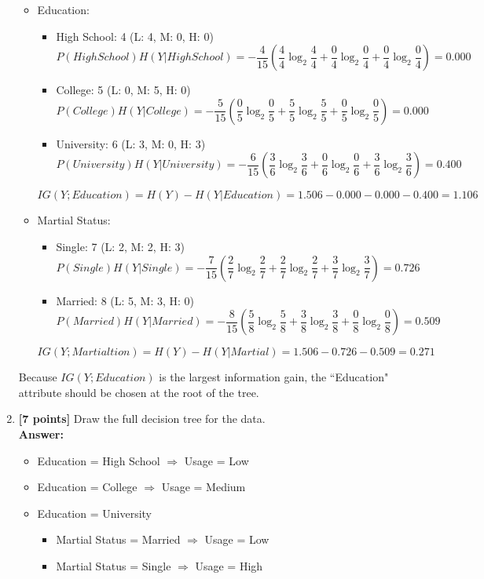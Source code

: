 \begin{enumerate}
\begin{itemize}
	\item Education:
	\begin{itemize}
		\item High School: 4 (L: 4, M: 0, H: 0)
		$$P(High School)H(Y|High School)=-\frac{4}{15}(\frac{4}{4}\log_2\frac{4}{4}+\frac{0}{4}\log_2\frac{0}{4}+\frac{0}{4}\log_2\frac{0}{4})=0.000$$
		\item College: 5 (L: 0, M: 5, H: 0)
		$$P(College)H(Y|College)=-\frac{5}{15}(\frac{0}{5}\log_2\frac{0}{5}+\frac{5}{5}\log_2\frac{5}{5}+\frac{0}{5}\log_2\frac{0}{5})=0.000$$
		\item University: 6 (L: 3, M: 0, H: 3)
		$$P(University)H(Y|University)=-\frac{6}{15}(\frac{3}{6}\log_2\frac{3}{6}+\frac{0}{6}\log_2\frac{0}{6}+\frac{3}{6}\log_2\frac{3}{6})=0.400$$
	\end{itemize}
	$$IG(Y;Education)=H(Y)-H(Y|Education)=1.506-0.000-0.000-0.400=1.106$$
	\item Martial Status:
	\begin{itemize}
		\item Single: 7 (L: 2, M: 2, H: 3)
		$$P(Single)H(Y|Single)=-\frac{7}{15}(\frac{2}{7}\log_2\frac{2}{7}+\frac{2}{7}\log_2\frac{2}{7}+\frac{3}{7}\log_2\frac{3}{7})=0.726$$
		\item Married: 8 (L: 5, M: 3, H: 0)
		$$P(Married)H(Y|Married)=-\frac{8}{15}(\frac{5}{8}\log_2\frac{5}{8}+\frac{3}{8}\log_2\frac{3}{8}+\frac{0}{8}\log_2\frac{0}{8})=0.509$$
	\end{itemize}
	$$IG(Y;Martialtion)=H(Y)-H(Y|Martial)=1.506-0.726-0.509=0.271$$
\end{itemize}
Because $IG(Y;Education)$ is the largest information gain, the ``Education" attribute should be chosen at the root of the tree.

\item\textbf{[7 points]} Draw the full decision tree for the data.
\\\textbf{Answer:}\\
\begin{itemize}
	\item Education = High School $\Rightarrow$ Usage = Low
	\item Education = College $\Rightarrow$ Usage = Medium
	\item Education = University
	\begin{itemize}
		\item Martial Status = Married $\Rightarrow$ Usage = Low
		\item Martial Status = Single $\Rightarrow$ Usage = High
	\end{itemize}
\end{itemize}

\end{enumerate}


